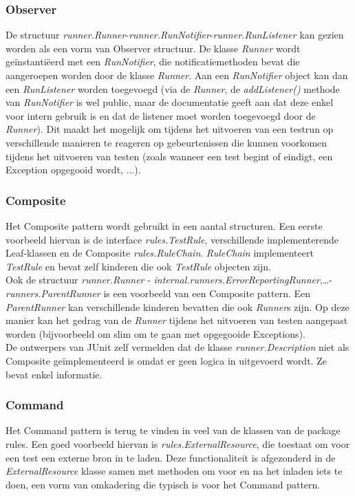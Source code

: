 \documentclass[i1]{oss}
\begin{document}
\subsubsection{Observer}
De structuur \emph{runner.Runner}-\emph{runner.RunNotifier}-\emph{runner.RunListener} kan gezien worden als een vorm van Observer structuur. 
De klasse \emph{Runner} wordt ge\"instanti\"eerd met een \emph{RunNotifier}, die notificatiemethoden bevat die aangeroepen worden door de klasse \emph{Runner}. 
Aan een \emph{RunNotifier} object kan dan een \emph{RunListener} worden toegevoegd (via de \emph{Runner}, de \emph{addListener()} methode van \emph{RunNotifier} is wel public, maar de documentatie geeft aan dat deze enkel voor intern gebruik is en dat de listener moet worden toegevoegd door de \emph{Runner}). 
Dit maakt het mogelijk om tijdens het uitvoeren van een testrun op verschillende manieren te reageren op gebeurtenissen die kunnen voorkomen tijdens het uitvoeren van testen (zoals wanneer een test begint of eindigt, een Exception opgegooid wordt, ...).

\subsubsection{Composite}
Het Composite pattern wordt gebruikt in een aantal structuren. Een eerste voorbeeld hiervan is de interface \emph{rules.TestRule}, verschillende implementerende Leaf-klassen en de Composite \emph{rules.RuleChain}. 
\emph{RuleChain} implementeert \emph{TestRule} en bevat zelf kinderen die ook \emph{TestRule} objecten zijn.
\\
Ook de structuur \emph{runner.Runner} - \emph{internal.runners.ErrorReportingRunner},\ldots - \emph{runners.ParentRunner} is een voorbeeld van een Composite pattern. 
Een \emph{ParentRunner} kan verschillende kinderen bevatten die ook \emph{Runner}s zijn. 
Op deze manier kan het gedrag van de \emph{Runner} tijdens het uitvoeren van testen aangepast worden (bijvoorbeeld om slim om te gaan met opgegooide Exceptions).
\\
De ontwerpers van JUnit zelf vermelden dat de klasse \emph{runner.Description} niet als Composite ge\"implementeerd is omdat er geen logica in uitgevoerd wordt. Ze bevat enkel informatie.

\subsubsection{Command}
Het Command pattern is terug te vinden in veel van de klassen van de package rules. 
Een goed voorbeeld hiervan is \emph{rules.ExternalResource}, die toestaat om voor een test een externe bron in te laden. 
Deze functionaliteit is afgezonderd in de \emph{ExternalResource} klasse samen met methoden om voor en na het inladen iets te doen, een vorm van omkadering die typisch is voor het Command pattern. 
\end{document}
